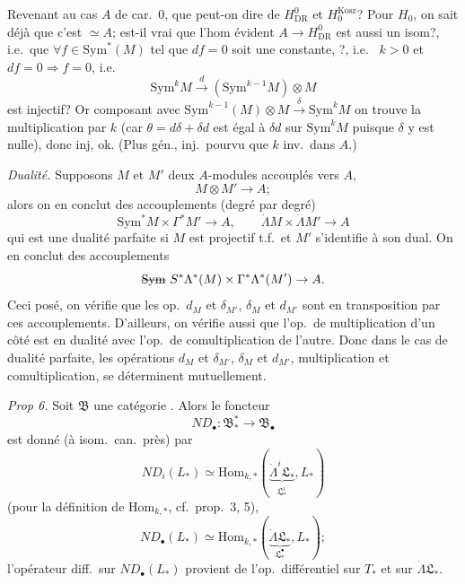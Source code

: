 \documentclass[11pt,a4paper]{article}
\begin{document}
Revenant au cas $A$ de car.\ $0$, que peut-on dire de
$H^0_{\mathrm{DR}}$ et $H_0^{\mathrm{Kosz}}$? Pour $H_0$, on sait déjà que c'est $\simeq A$;
est-il vrai que l'hom évident $A \to H^0_{\mathrm{DR}}$ est aussi
un isom?, \struck{\ill{}} i.e.\ que $\forall f \in \mathrm{Sym}^*(M)$ tel que
$df = 0$ soit \struck{\ill{}} une constante, ?, i.e.\ 
$k > 0$ et $df = 0 \Rightarrow f = 0$, i.e.
\[ \mathrm{Sym}^kM \xrightarrow{\ d\ } (\mathrm{Sym}^{k-1}M) \otimes M \]
 est injectif? Or composant avec
$\mathrm{Sym}^{k-1}(M) \otimes M \xrightarrow{\ \delta\ } \mathrm{Sym}^kM$ 
on trouve la multiplication par $k$ (car $\theta = d\delta + \delta d$ est égal
à $\delta d$ sur $\mathrm{Sym}^kM$ puisque $\delta$ y est nulle), donc inj, ok.
(Plus gén., inj.\ pourvu que $k$ inv.\ dans $A$.)

\emph{Dualité.} Supposons $M$ et $M'$ deux $A$-modules accouplés
vers $A$,
\[ M \otimes M' \to A ; \]
alors on en conclut des accouplements (degré par degré)
\[ \mathrm{Sym}^*M \times \Gamma^*M' \to A, \qquad \dot\Lambda M \times \dot\Lambda M' \to A \]
qui est une dualité parfaite si $M$ est projectif t.f.\ et
$M'$ s'identifie à son dual. On en conclut des accouplements
\[ \text{\struck{$\mathrm{Sym}$}}\ S^*\Lambda^*(M) \times \Gamma^*\Lambda^*(M') \to A . \]
Ceci posé, on vérifie que les op.\ $d_M$ et $\delta_{M'}$, $\delta_M$ et $d_{M'}$
sont \struck{\ill{}} en transposition par ces accouplements.
D'ailleurs, on vérifie aussi que l'op.\ de multipli\-cation
d'un côté est en dualité avec l'op.\
de comultiplication de l'autre. Donc dans le cas
de dualité parfaite, les opérations $d_M$ et $\delta_{M'}$, $\delta_M$ et $d_{M'}$,
multiplication et comultiplication, se déterminent mutuellement.

\emph{Prop 6.} Soit $\mathfrak{B}$ une catégorie \ill{}.
Alors le foncteur
\[ ND_\bullet : \mathfrak{B}^*_* \to \mathfrak{B}_\bullet \]
est donné (à isom.\ can.\ près) par
\[ ND_i(L_*) \simeq \mathrm{Hom}_{k,*}(\underbrace{\dot\Lambda^i\mathfrak{L}_*}_{\mathfrak{L}^i_*}, L_*) \]
(pour la définition de $\mathrm{Hom}_{k,*}$, cf.\ prop.\ 3, 5),
\struck{\ill{}}
\[ ND_\bullet(L_*) \simeq \mathrm{Hom}_{k,*}(\underbrace{\dot\Lambda\mathfrak{L}_*}_{\mathfrak{L}^\bullet_*}, L_*) ; \]
l'opérateur diff.\ sur $ND_\bullet(L_*)$ provient de
l'op.\ différentiel sur $T_*$ et sur $\dot\Lambda\mathfrak{L}_*$.
\end{document}
